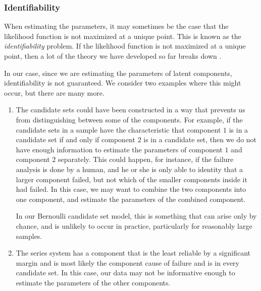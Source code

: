 \documentclass[
]{article}
\begin{document}
\hypertarget{identifiability}{%
\subsubsection*{Identifiability}\label{identifiability}}

When estimating the parameters, it may sometimes be the case that the
likelihood function is not maximized at a unique point. This is known as
the \emph{identifiability} problem. If the likelihood function is not
maximized at a unique point, then a lot of the theory we have developed
so far breaks down \citep{mclachlan2007algorithm}.

In our case, since we are estimating the parameters of latent
components, identifiability is not guaranteed. We consider two examples
where this might occur, but there are many more.

\begin{enumerate}
\def\labelenumi{\arabic{enumi}.}
\item
  The candidate sets could have been constructed in a way that prevents
  us from distinguishing between some of the components. For example, if
  the candidate sets in a sample have the characteristic that component
  \(1\) is in a candidate set if and only if component \(2\) is in a
  candidate set, then we do not have enough information to estimate the
  parameters of component \(1\) and component \(2\) separately. This
  could happen, for instance, if the failure analysis is done by a
  human, and he or she is only able to identity that a larger component
  failed, but not which of the smaller components inside it had failed.
  In this case, we may want to combine the two components into one
  component, and estimate the parameters of the combined component.

  In our Bernoulli candidate set model, this is something that can arise
  only by chance, and is unlikely to occur in practice, particularly for
  reasonably large samples.
\item
  The series system has a component that is the least reliable by a
  significant margin and is most likely the component cause of failure
  and is in every candidate set. In this case, our data may not be
  informative enough to estimate the parameters of the other components.
\end{enumerate}
\end{document}
